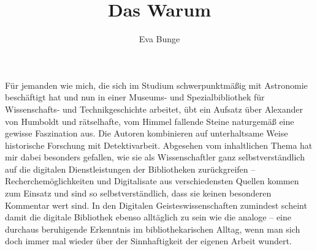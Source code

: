 \documentclass[output=paper]{langsci/langscibook}
\title{Das Warum}
\author{Eva Bunge  \affiliation{Deutsches Museum}}
\begin{document}
\maketitle

\noindent Für jemanden wie mich, die sich im Studium schwerpunktmäßig mit Astronomie beschäftigt hat und nun in einer Museums- und Spezialbibliothek für Wissenschafts- und Technikgeschichte arbeitet, übt ein Aufsatz über Alexander von Humboldt und rätselhafte, vom Himmel fallende Steine naturgemäß eine gewisse Faszination aus. Die Autoren kombinieren auf unterhaltsame Weise historische Forschung mit Detektivarbeit. Abgesehen vom inhaltlichen Thema hat mir dabei besonders gefallen, wie sie als Wissenschaftler ganz selbstverständlich auf die digitalen Dienstleistungen der Bibliotheken zurückgreifen – Recherchemöglichkeiten und Digitalisate aus verschiedensten Quellen kommen zum Einsatz und sind so selbstverständlich, dass sie keinen besonderen Kommentar wert sind. In den Digitalen Geisteswissenschaften zumindest scheint damit die digitale Bibliothek ebenso alltäglich zu sein wie die analoge – eine durchaus beruhigende Erkenntnis im bibliothekarischen Alltag, wenn man sich doch immer mal wieder über der Sinnhaftigkeit der eigenen Arbeit wundert.
\end{document}
